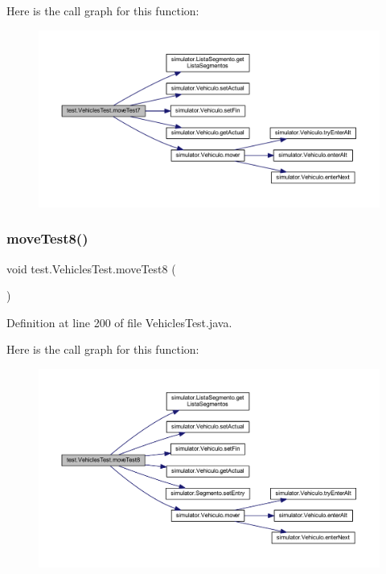Here is the call graph for this function\+:\nopagebreak
\begin{figure}[H]
\begin{center}
\leavevmode
\includegraphics[width=350pt]{classtest_1_1_vehicles_test_ac0fe870f7fb0e6bd96317b5e8a9c06d0_cgraph}
\end{center}
\end{figure}
\mbox{\label{classtest_1_1_vehicles_test_ae80a57f1f29cea08685e8f835d0a6d63}} 
\subsubsection{\texorpdfstring{move\+Test8()}{moveTest8()}}
{\footnotesize\ttfamily void test.\+Vehicles\+Test.\+move\+Test8 (\begin{DoxyParamCaption}{ }\end{DoxyParamCaption})}



Definition at line 200 of file Vehicles\+Test.\+java.

Here is the call graph for this function\+:\nopagebreak
\begin{figure}[H]
\begin{center}
\leavevmode
\includegraphics[width=350pt]{classtest_1_1_vehicles_test_ae80a57f1f29cea08685e8f835d0a6d63_cgraph}
\end{center}
\end{figure}
\mbox{\label{classtest_1_1_vehicles_test_ae9e8f3b27af5bb2a0d7b7f52da6ba833}} 
